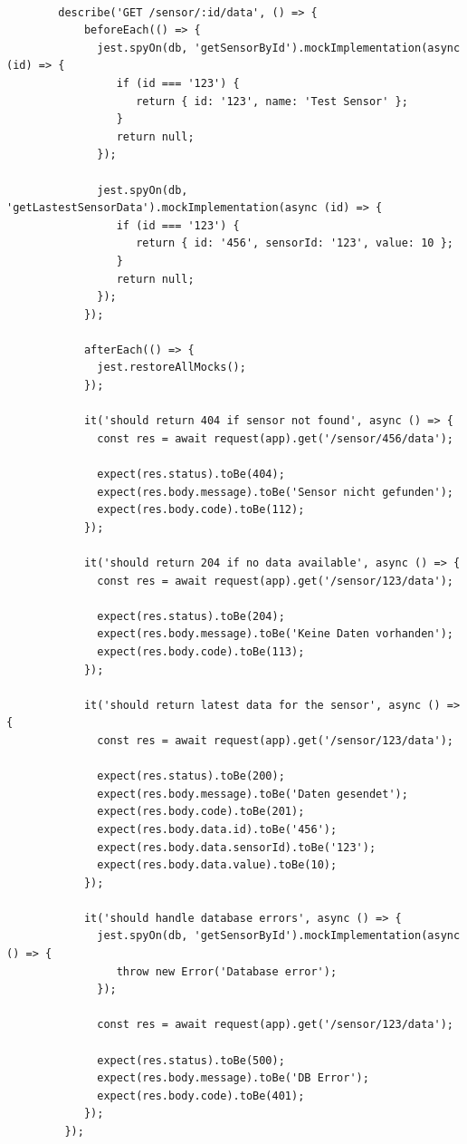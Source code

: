 	\begin{lstlisting}[caption={Sensor schickt Daten (Backend) Unit-Tests }, style=js]

		describe('GET /sensor/:id/data', () => {
			beforeEach(() => {
			  jest.spyOn(db, 'getSensorById').mockImplementation(async (id) => {
				 if (id === '123') {
					return { id: '123', name: 'Test Sensor' };
				 }
				 return null;
			  });

			  jest.spyOn(db, 'getLastestSensorData').mockImplementation(async (id) => {
				 if (id === '123') {
					return { id: '456', sensorId: '123', value: 10 };
				 }
				 return null;
			  });
			});

			afterEach(() => {
			  jest.restoreAllMocks();
			});

			it('should return 404 if sensor not found', async () => {
			  const res = await request(app).get('/sensor/456/data');

			  expect(res.status).toBe(404);
			  expect(res.body.message).toBe('Sensor nicht gefunden');
			  expect(res.body.code).toBe(112);
			});

			it('should return 204 if no data available', async () => {
			  const res = await request(app).get('/sensor/123/data');

			  expect(res.status).toBe(204);
			  expect(res.body.message).toBe('Keine Daten vorhanden');
			  expect(res.body.code).toBe(113);
			});

			it('should return latest data for the sensor', async () => {
			  const res = await request(app).get('/sensor/123/data');

			  expect(res.status).toBe(200);
			  expect(res.body.message).toBe('Daten gesendet');
			  expect(res.body.code).toBe(201);
			  expect(res.body.data.id).toBe('456');
			  expect(res.body.data.sensorId).toBe('123');
			  expect(res.body.data.value).toBe(10);
			});

			it('should handle database errors', async () => {
			  jest.spyOn(db, 'getSensorById').mockImplementation(async () => {
				 throw new Error('Database error');
			  });

			  const res = await request(app).get('/sensor/123/data');

			  expect(res.status).toBe(500);
			  expect(res.body.message).toBe('DB Error');
			  expect(res.body.code).toBe(401);
			});
		 });
	\end{lstlisting}
\clearpage




